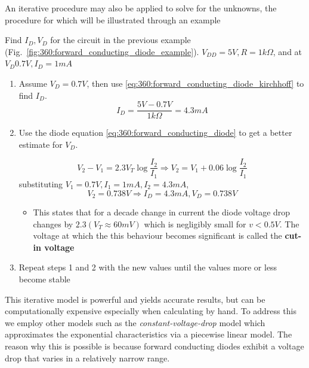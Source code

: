 \documentclass[10pt]{article}
\begin{document}
An iterative procedure may also be applied to solve for the unknowns, the procedure for which will be illustrated through an example


\begin{example}

	Find $ I_D, V_D $ for the circuit in the previous example (Fig.~\ref{fig:360:forward_conducting_diode_example}). $ V_{DD} = 5V, R = 1k\Omega $, and at $ V_{D} 0.7V, I_D = 1mA $ 


\begin{enumerate}
	\item Assume $ V_D = 0.7V$, then use \eqref{eq:360:forward_conducting_diode_kirchhoff} to find $ I_D $.
		\begin{equation}
			I_D = \frac{5V - 0.7V}{1k\Omega} = 4.3mA
		\end{equation}
		
	\item Use the diode equation \eqref{eq:360:forward_conducting_diode} to get a better estimate for $ V_D $.

		\begin{equation}
			V_2 - V_1 = 2.3 V_T \log \frac{I_2}{I_1} \Rightarrow V_2 = V_1 + 0.06 \log \frac{I_2}{I_1}
		\end{equation}
	substituting $ V_1 = 0.7V, I_1 = 1mA, I_2 = 4.3mA $,
	\begin{equation}
		V_2 = 0.738V \Rightarrow I_D = 4.3mA, V_D = 0.738V
	\end{equation}
	\begin{itemize}
		\item This states that for a decade change in current the diode voltage drop changes by $ 2.3(V_T \approx 60mV) $ which is negligibly small for $ v < 0.5V $. 
		The voltage at which the this behaviour becomes significant is called the \textbf{cut-in voltage} 
	\end{itemize}

\item Repeat steps 1 and 2 with the new values until the values more or less become stable
\end{enumerate}
\end{example}

This iterative model is powerful and yields accurate results, but can be computationally expensive especially when calculating by hand.
To address this we employ other models such as the \textit{constant-voltage-drop} model which approximates the exponential characteristics via a piecewise linear model.
The reason why this is possible is because forward conducting diodes exhibit a voltage drop that varies in a relatively narrow range.
\end{document}
